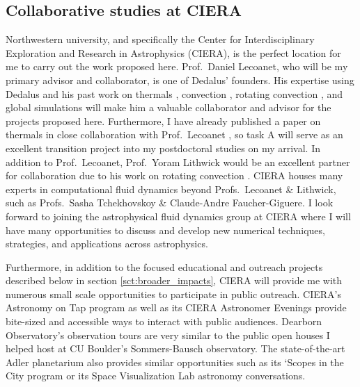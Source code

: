 \documentclass[11pt, preprint]{aastex}
\begin{document}
\vspace{-0.8cm}
\subsection*{Collaborative studies at CIERA}
\vspace{-0.3cm}
\label{sct:ciera}
Northwestern university, and specifically the Center for Interdisciplinary Exploration and Research in Astrophysics (CIERA), is the perfect location for me to carry out the work proposed here.
Prof.~Daniel Lecoanet, who will be my primary advisor and collaborator, is one of Dedalus' founders.
His expertise using Dedalus and his past work on thermals \citep{lecoanet&jeevanjee2019, tarshis&all2018}, convection \citep{lecoanet&quataert2013, lecoanet&all2014, couston&all2017}, rotating convection \citep{couston&all2019}, and global simulations \citep{lecoanet&all2019} will make him a valuable collaborator and advisor for the projects proposed here.
Furthermore, I have already published a paper on thermals in close collaboration with Prof.~Lecoanet \citep{andersLB2019}, so task A will serve as an excellent transition project into my postdoctoral studies on my arrival.
In addition to Prof.~Lecoanet, Prof.~Yoram Lithwick would be an excellent partner for collaboration due to his work on rotating convection \citep[e.g.,][]{BDLithwick2014}.
CIERA houses many experts in computational fluid dynamics beyond Profs.~Lecoanet \& Lithwick, such as Profs.~Sasha Tchekhovskoy \& Claude-Andre Faucher-Giguere.
I look forward to joining the astrophysical fluid dynamics group at CIERA where I will have many opportunities to discuss and develop new numerical techniques, strategies, and applications across astrophysics.


Furthermore, in addition to the focused educational and outreach projects described below in section \ref{sct:broader_impacts}, CIERA will provide me with numerous small scale opportunities to participate in public outreach.
CIERA's Astronomy on Tap program as well as its CIERA Astronomer Evenings provide bite-sized and accessible ways to interact with public audiences.
Dearborn Observatory's observation tours are very similar to the public open houses I helped host at CU Boulder's Sommers-Bausch observatory.
The state-of-the-art Adler planetarium also provides similar opportunities such as its `Scopes in the City program or its Space Visualization Lab astronomy conversations.
\end{document}
